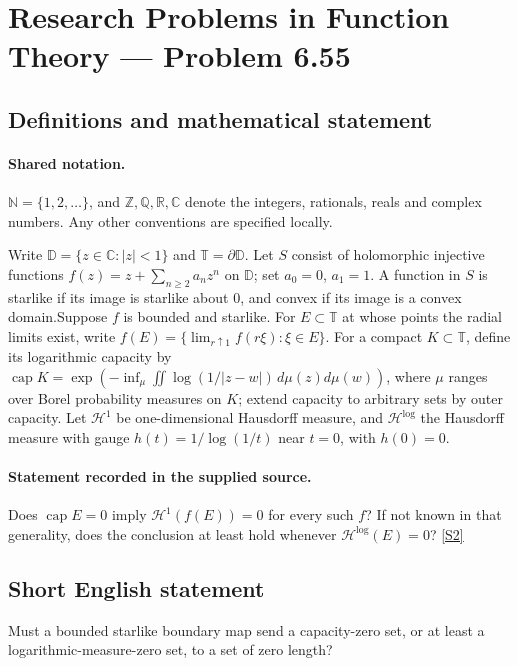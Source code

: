 \documentclass[11pt]{article}
\newcommand{\sref}[2]{\hyperlink{source:#1:#2}{[S#2]}}
\begin{document}
\section{Research Problems in Function Theory — Problem 6.55}\label{statement}

\subsection{Definitions and mathematical statement}

\paragraph{Shared notation.}$\mathbb N=\{1,2,\ldots\}$, and $\mathbb Z,\mathbb Q,\mathbb R,\mathbb C$ denote the integers, rationals, reals and complex numbers. Any other conventions are specified locally.


Write $\mathbb D=\{z\in\mathbb C:|z|<1\}$ and $\mathbb T=\partial\mathbb D$. Let $S$ consist of holomorphic injective functions $f(z)=z+\sum_{n\ge2}a_nz^n$ on $\mathbb D$; set $a_0=0$, $a_1=1$. A function in $S$ is starlike if its image is starlike about $0$, and convex if its image is a convex domain.Suppose $f$ is bounded and starlike. For $E\subset\mathbb T$ at whose points the radial limits exist, write $f(E)=\{\lim_{r\uparrow1}f(r\xi):\xi\in E\}$. For a compact $K\subset\mathbb T$, define its logarithmic capacity by $\operatorname{cap}K=\exp(-\inf_\mu\iint\log(1/|z-w|)\,d\mu(z)d\mu(w))$, where $\mu$ ranges over Borel probability measures on $K$; extend capacity to arbitrary sets by outer capacity. Let $\mathcal H^1$ be one-dimensional Hausdorff measure, and $\mathcal H^{\log}$ the Hausdorff measure with gauge $h(t)=1/\log(1/t)$ near $t=0$, with $h(0)=0$.
\paragraph{Statement recorded in the supplied source.}
Does $\operatorname{cap}E=0$ imply $\mathcal H^1(f(E))=0$ for every such $f$? If not known in that generality, does the conclusion at least hold whenever $\mathcal H^{\log}(E)=0$? \sref{statement}{2}
\subsection{Short English statement}
Must a bounded starlike boundary map send a capacity-zero set, or at least a logarithmic-measure-zero set, to a set of zero length?
\end{document}

